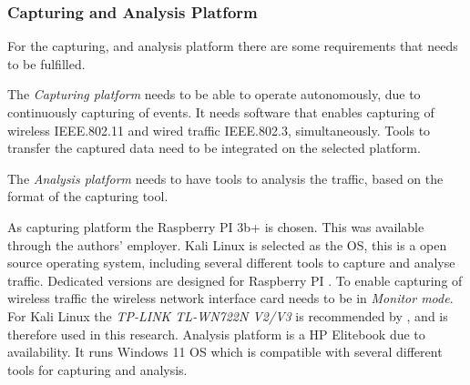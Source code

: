 \subsubsection{Capturing and Analysis Platform}
For the capturing, and analysis platform there are some requirements that needs to be fulfilled.

 The \textit{Capturing platform} needs to be able to operate autonomously, due to continuously capturing of events. It needs software that enables capturing of wireless IEEE.802.11 and wired traffic IEEE.802.3, simultaneously. Tools to transfer the captured data need to be integrated on the selected platform. 
 
 The \textit{Analysis platform} needs to have tools to analysis the traffic, based on the format of the capturing tool. 


As capturing platform the Raspberry PI 3b+ is chosen. This was available through the authors' employer. Kali Linux is selected as the OS, this is a open source operating system, including several different tools to capture and analyse traffic. Dedicated versions are designed for Raspberry PI \cite{kalidownload}. To enable capturing of wireless traffic the wireless network interface card needs to be in \textit{Monitor mode}. For Kali Linux the \textit{TP-LINK TL-WN722N V2/V3} is recommended by \cite{Kali_monitormode_guide}, and is therefore used in this research. 
Analysis platform is a HP Elitebook due to availability. It runs Windows 11 OS which is compatible with several different tools for capturing and analysis.

